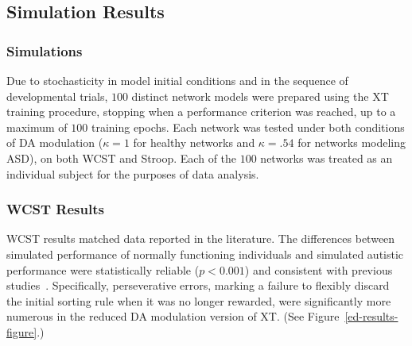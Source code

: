 \subsection{Simulation Results}

\subsubsection{Simulations} 
Due to stochasticity in model initial conditions and in the sequence of developmental trials, $100$ distinct network models were prepared using the XT training procedure, stopping when a performance criterion was reached, up to a maximum of $100$ training epochs.  Each network was tested under both conditions of DA modulation ($\kappa = 1$ for healthy networks and $\kappa = .54$ for networks modeling ASD), on both WCST and Stroop. Each of the $100$ networks was treated as an individual subject for the purposes of data analysis.

\subsubsection{WCST Results} 
WCST results matched data reported in the literature. The differences between simulated performance of normally functioning individuals and simulated autistic performance were statistically reliable ($p < 0.001$) and consistent with previous studies~\cite{PriorMR:1990:AutismWCST,Ozonoff:1999:AutismStroopWCST,MinshewNJ:2002:AutismWCST}. Specifically, perseverative errors, marking a failure to flexibly discard the initial sorting rule when it was no longer rewarded, were significantly more numerous in the reduced DA modulation version of XT. (See Figure~\ref{ed-results-figure}.)

